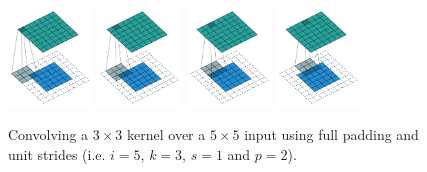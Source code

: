 \documentclass{article}
\begin{document}
\begin{figure}[t]
    \centering
    \includegraphics[width=0.2\textwidth]{pdf/full_padding_no_strides_00.pdf}
    \includegraphics[width=0.2\textwidth]{pdf/full_padding_no_strides_01.pdf}
    \includegraphics[width=0.2\textwidth]{pdf/full_padding_no_strides_02.pdf}
    \includegraphics[width=0.2\textwidth]{pdf/full_padding_no_strides_03.pdf}
    \caption{\label{fig:full_padding_no_strides} Convolving a $3 \times 3$
        kernel over a $5 \times 5$ input using full padding and unit strides
        (i.e. $i = 5$, $k = 3$, $s = 1$ and $p = 2$).}
\end{figure}
\end{document}
